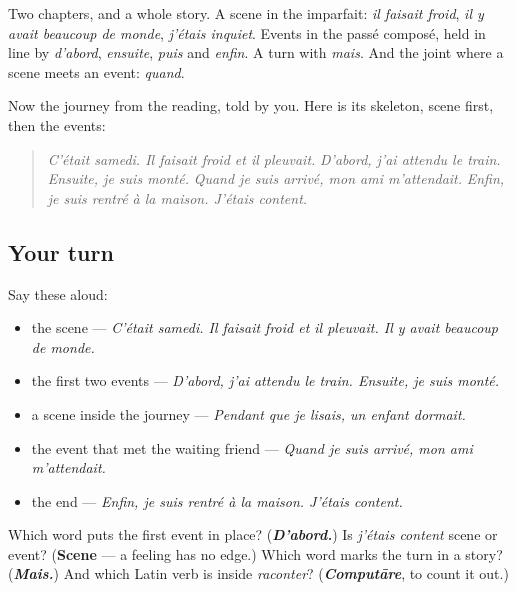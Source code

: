 \begin{grammarlens}[title={What you've built}]
Two chapters, and a whole story. A scene in the imparfait: \emph{il faisait froid}, \emph{il y avait beaucoup de monde}, \emph{j'étais inquiet}. Events in the passé composé, held in line by \emph{d'abord}, \emph{ensuite}, \emph{puis} and \emph{enfin}. A turn with \emph{mais}. And the joint where a scene meets an event: \emph{quand}.

Now the journey from the reading, told by you. Here is its skeleton, scene first, then the events:

\begin{quote}
\emph{C'était samedi. Il faisait froid et il pleuvait.} \emph{D'abord, j'ai attendu le train. Ensuite, je suis monté.} \emph{Quand je suis arrivé, mon ami m'attendait.} \emph{Enfin, je suis rentré à la maison. J'étais content.}
\end{quote}
\end{grammarlens}

\subsection*{Your turn}
Say these aloud:

\begin{itemize}
\raggedright
  \item the scene — \emph{C'était samedi. Il faisait froid et il pleuvait. Il y avait beaucoup de monde.}
  \item the first two events — \emph{D'abord, j'ai attendu le train. Ensuite, je suis monté.}
  \item a scene inside the journey — \emph{Pendant que je lisais, un enfant dormait.}
  \item the event that met the waiting friend — \emph{Quand je suis arrivé, mon ami m'attendait.}
  \item the end — \emph{Enfin, je suis rentré à la maison. J'étais content.}
\end{itemize}

\begin{tcolorbox}[breakable,colback=teal!4,colframe=teal!35!black,title={Before you move on}]
Which word puts the first event in place? (\emph{\textbf{D'abord.}}) Is \emph{j'étais content} scene or event? (\textbf{Scene} — a feeling has no edge.) Which word marks the turn in a story? (\emph{\textbf{Mais.}}) And which Latin verb is inside \emph{raconter}? (\emph{\textbf{Computāre}}, to count it out.)
\end{tcolorbox}
